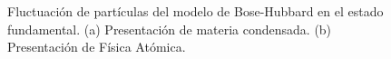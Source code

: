 \documentclass[11pt,letterpaper]{article}
\begin{document}
\begin{figure}[t]
\centering
{}
\caption{Fluctuación de partículas del modelo de Bose-Hubbard en el estado
fundamental. (a) Presentación de materia condensada. (b) Presentación de
Física Atómica.}
\end{figure}
\end{document}

